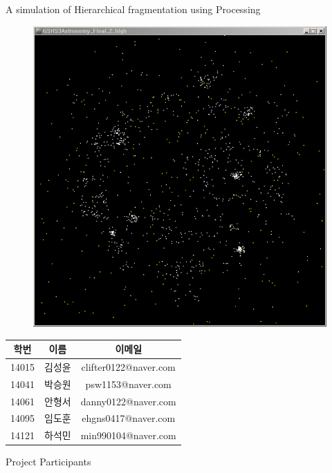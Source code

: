 \documentclass{gshs-hutech}
\begin{document}
	\begin{center}
		\LARGE A simulation of Hierarchical fragmentation using Processing
	\end{center}

\begin{figure}[h]
	\begin{center}
		\includegraphics[scale=0.7]{cover.png}
	\end{center}
\end{figure}

\begin{table}[h]
	\begin{center}
		\begin{tabular}{|c|c|c|}
			\hline
			학번&이름&이메일\\
			\hline
			14015&김성윤&clifter0122@naver.com\\
			\hline
			14041&박승원&psw1153@naver.com\\
			\hline
			14061&안형서&danny0122@naver.com\\
			\hline
			14095&임도훈&ehgns0417@naver.com\\
			\hline
			14121&하석민&min990104@naver.com\\
			\hline
		\end{tabular}
		
		Project Participants
	\end{center}
\end{table}
\clearpage
\tableofcontents
\end{document}
